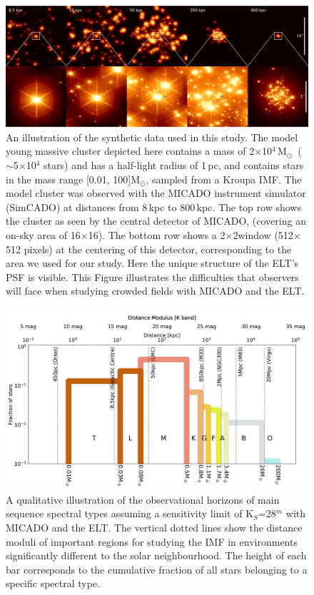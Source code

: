 \documentclass{aa}
\newcommand{\msun}{M$_\odot$~}
\newcommand{\msune}{M$_\odot$}
\begin{document}
\begin{figure}
    \centering
    \includegraphics[width=\textwidth]{5_clusters.pdf}
    \caption{An illustration of the synthetic data used in this study.
    The model young massive cluster depicted here contains a mass of 2$\times$10$^4$\,\msun ($\sim$5$\times$10$^4$ stars) and has a half-light radius of 1\,pc, and contains stars in the mass range [0.01, 100]\msune, sampled from a Kroupa IMF.
    The model cluster was observed with the MICADO instrument simulator (SimCADO) at distances from 8\,kpc to 800\,kpc.
    The top row shows the cluster as seen by the central detector of MICADO, (covering an on-sky area of 16\arcsec$\times$16\arcsec).
    The bottom row shows a 2\arcsec$\times$2\arcsec window (512$\times$512 pixels) at the centering of this detector, corresponding to the area we used for our study.
    Here the unique structure of the ELT's PSF is visible.
    This Figure illustrates the difficulties that observers will face when studying crowded fields with MICADO and the ELT.
    }
    \label{fig:5_clusters}
\end{figure}


\begin{figure}
    \centering
    \includegraphics[width=\textwidth]{imf_educational.pdf}
    \caption{A qualitative illustration of the observational horizons of main sequence spectral types assuming a sensitivity limit of K$_S$=28$^m$ with MICADO and the ELT.
    The vertical dotted lines show the distance moduli of important regions for studying the IMF in environments significantly different to the solar neighbourhood.
    The height of each bar corresponds to the cumulative fraction of all stars belonging to a specific spectral type.
    }
    \label{fig:imf_educational}
\end{figure}
\end{document}

